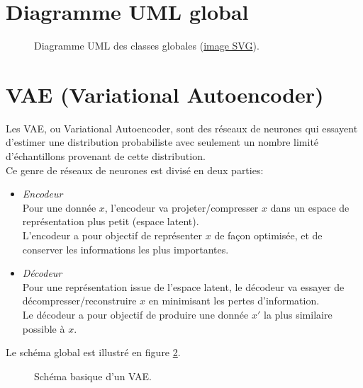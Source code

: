 \begin{appendices}
	
	
\clearpage
\section*{Diagramme UML global}\label{app:UMLGlobal}
\begin{figure}[!htbp]
	\center
	\caption{Diagramme UML des classes globales (\href{https://github.com/gabriel-combe/PP2_Particle_Filter/blob/test/rapport/UML/classes.svg}{image SVG}).}
	\label{fig:uml_diagram_classes}
\end{figure}
\FloatBarrier
	
	
	
	
\section*{VAE (Variational Autoencoder)}\label{app:variational_autoencoder}
Les VAE, ou Variational Autoencoder, sont des réseaux de neurones qui essayent d'estimer une distribution probabiliste avec seulement un nombre limité d'échantillons provenant de cette distribution.\\
Ce genre de réseaux de neurones est divisé en deux parties:\\
\begin{itemize}
	\item \emph{Encodeur}\\
	Pour une donnée $x$, l'encodeur va projeter/compresser $x$ dans un espace de représentation plus petit (espace latent).\\
	L'encodeur a pour objectif de représenter $x$ de façon optimisée, et de conserver les informations les plus importantes.\\
	\item \emph{Décodeur}\\
	Pour une représentation issue de l'espace latent, le décodeur va essayer de décompresser/reconstruire $x$ en minimisant les pertes d'information.\\
	Le décodeur a pour objectif de produire une donnée $x'$ la plus similaire possible à $x$.\\
\end{itemize}
	
Le schéma global est illustré en figure \ref{fig:vae_scheme}.
\begin{figure}[!htbp]
\center
\caption{Schéma basique d'un VAE.}
\label{fig:vae_scheme}
\end{figure}
\FloatBarrier

\end{appendices}

\clearpage
